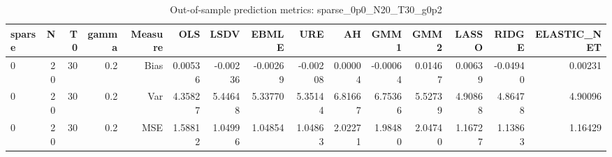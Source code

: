 \begin{table}[!htbp]\centering
\caption{Out-of-sample prediction metrics: sparse_0p0_N20_T30_g0p2}
\label{tab:table3_sparse_0p0_N20_T30_g0p2}
\begin{tabular}{lrrrrrrrrrrrrrr}
\hline
sparse & N & T0 & gamma & Measure & OLS & LSDV & EBMLE & URE & AH & GMM1 & GMM2 & LASSO & RIDGE & ELASTIC_NET \\
\hline
0 & 20 & 30 & 0.2 & Bias & 0.00536 & -0.00236 & -0.00269 & -0.00208 & 0.00004 & -0.00064 & 0.01467 & 0.00639 & -0.04940 & 0.00231 \\
0 & 20 & 30 & 0.2 & Var & 4.35827 & 5.44648 & 5.33770 & 5.35144 & 6.81667 & 6.75366 & 5.52739 & 4.90868 & 4.86478 & 4.90096 \\
0 & 20 & 30 & 0.2 & MSE & 1.58812 & 1.04996 & 1.04854 & 1.04863 & 2.02271 & 1.98480 & 2.04740 & 1.16727 & 1.13863 & 1.16429 \\
\hline
\end{tabular}
\end{table}

